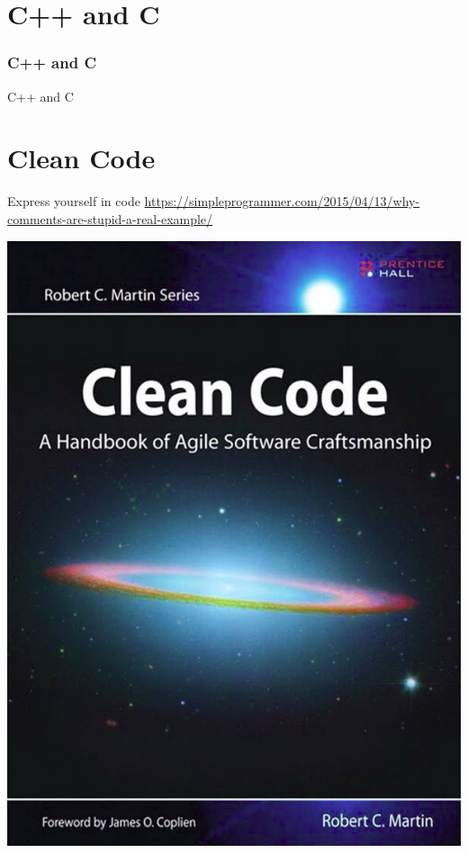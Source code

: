 \documentclass{beamer}
\begin{document}
\part{C++ and C}
\section{C++ and C}
\begin{frame}{C++ and C}
\end{frame}


\part{Clean Code}
\begin{frame}{Express yourself in code}
\url{https://simpleprogrammer.com/2015/04/13/why-comments-are-stupid-a-real-example/}
\end{frame}

\begin{frame}
\includegraphics[scale=0.25]{img/CleanCode.png}
\end{frame}
\end{document}
